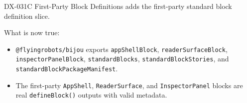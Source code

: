 DX-031C First-Party Block Definitions adds the first-party standard block definition slice.

What is now true:

\begin{itemize}
\tightlist
\item
  \texttt{@\allowbreak{}f\allowbreak{}l\allowbreak{}y\allowbreak{}i\allowbreak{}n\allowbreak{}g\allowbreak{}r\allowbreak{}o\allowbreak{}b\allowbreak{}o\allowbreak{}t\allowbreak{}s\allowbreak{}/\allowbreak{}b\allowbreak{}i\allowbreak{}j\allowbreak{}o\allowbreak{}u} exports \texttt{a\allowbreak{}p\allowbreak{}p\allowbreak{}S\allowbreak{}h\allowbreak{}e\allowbreak{}l\allowbreak{}l\allowbreak{}B\allowbreak{}l\allowbreak{}o\allowbreak{}c\allowbreak{}k}, \texttt{r\allowbreak{}e\allowbreak{}a\allowbreak{}d\allowbreak{}e\allowbreak{}r\allowbreak{}S\allowbreak{}u\allowbreak{}r\allowbreak{}f\allowbreak{}a\allowbreak{}c\allowbreak{}e\allowbreak{}B\allowbreak{}l\allowbreak{}o\allowbreak{}c\allowbreak{}k}, \texttt{i\allowbreak{}n\allowbreak{}s\allowbreak{}p\allowbreak{}e\allowbreak{}c\allowbreak{}t\allowbreak{}o\allowbreak{}r\allowbreak{}P\allowbreak{}a\allowbreak{}n\allowbreak{}e\allowbreak{}l\allowbreak{}B\allowbreak{}l\allowbreak{}o\allowbreak{}c\allowbreak{}k}, \texttt{s\allowbreak{}t\allowbreak{}a\allowbreak{}n\allowbreak{}d\allowbreak{}a\allowbreak{}r\allowbreak{}d\allowbreak{}B\allowbreak{}l\allowbreak{}o\allowbreak{}c\allowbreak{}k\allowbreak{}s}, \texttt{s\allowbreak{}t\allowbreak{}a\allowbreak{}n\allowbreak{}d\allowbreak{}a\allowbreak{}r\allowbreak{}d\allowbreak{}B\allowbreak{}l\allowbreak{}o\allowbreak{}c\allowbreak{}k\allowbreak{}S\allowbreak{}t\allowbreak{}o\allowbreak{}r\allowbreak{}i\allowbreak{}e\allowbreak{}s}, and \texttt{s\allowbreak{}t\allowbreak{}a\allowbreak{}n\allowbreak{}d\allowbreak{}a\allowbreak{}r\allowbreak{}d\allowbreak{}B\allowbreak{}l\allowbreak{}o\allowbreak{}c\allowbreak{}k\allowbreak{}P\allowbreak{}a\allowbreak{}c\allowbreak{}k\allowbreak{}a\allowbreak{}g\allowbreak{}e\allowbreak{}M\allowbreak{}a\allowbreak{}n\allowbreak{}i\allowbreak{}f\allowbreak{}e\allowbreak{}s\allowbreak{}t}.
\item
  The first-party \texttt{A\allowbreak{}p\allowbreak{}p\allowbreak{}S\allowbreak{}h\allowbreak{}e\allowbreak{}l\allowbreak{}l}, \texttt{R\allowbreak{}e\allowbreak{}a\allowbreak{}d\allowbreak{}e\allowbreak{}r\allowbreak{}S\allowbreak{}u\allowbreak{}r\allowbreak{}f\allowbreak{}a\allowbreak{}c\allowbreak{}e}, and \texttt{I\allowbreak{}n\allowbreak{}s\allowbreak{}p\allowbreak{}e\allowbreak{}c\allowbreak{}t\allowbreak{}o\allowbreak{}r\allowbreak{}P\allowbreak{}a\allowbreak{}n\allowbreak{}e\allowbreak{}l} blocks are real \texttt{d\allowbreak{}e\allowbreak{}f\allowbreak{}i\allowbreak{}n\allowbreak{}e\allowbreak{}B\allowbreak{}l\allowbreak{}o\allowbreak{}c\allowbreak{}k\allowbreak{}(\allowbreak{})} outputs with valid metadata.

\end{itemize}
